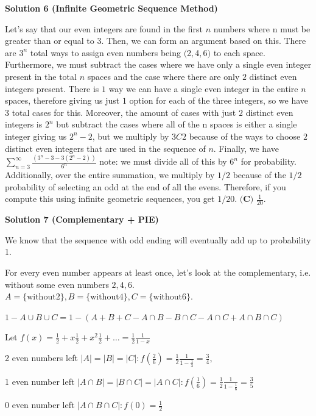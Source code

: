\begin{enumerate}
 



\textbf{Solution 6 (Infinite Geometric Sequence Method)}

Let's say that our even integers are found in the first $n$ numbers where n must be greater than or equal to $3$. Then, we can form an argument based on this. There are $3^n$ total ways to assign even numbers being $($2$,$4$,$6$)$ to each space. Furthermore, we must subtract the cases where we have only a single even integer present in the total $n$ spaces and the case where there are only $2$ distinct even integers present. There is $1$ way we can have a single even integer in the entire $n$ spaces, therefore giving us just $1$ option for each of the three integers, so we have $3$ total cases for this. Moreover, the amount of cases with just $2$ distinct even integers is $2^n$ but subtract the cases where all of the n spaces is either a single integer giving us $2^n-2$, but we multiply by $3C2$ because of the ways to choose $2$ distinct even integers that are used in the sequence of $n$. Finally, we have $\sum_{n=3}^{\infty} \frac{(3^n-3-3(2^n-2))}{6^n}$ note: we must divide all of this by $6^n$ for probability. Additionally, over the entire summation, we multiply by $1/2$ because of the $1/2$ probability of selecting an odd at the end of all the evens. Therefore, if you compute this using infinite geometric sequences, you get $1/20$. $\boxed{\textbf{(C) }\frac{1}{20}.}$




\textbf{Solution 7 (Complementary + PIE)}

We know that the sequence with odd ending will eventually add up to probability 1. 

 For every even number appears at least once, let's look at the complementary, i.e. without some even numbers ${2, 4, 6}$. $A = \{ \text{without} 2\}, B = \{ \text{without} 4\}, C = \{ \text{without} 6\}$.

 $1 - A\cup B\cup C = 1 - (A + B + C - A\cap B - B\cap C - A\cap C + A\cap B\cap C)$

 Let $f(x) = \frac{1}{2} + x\frac{1}{2} + x^2\frac{1}{2} + \ldots = \frac{1}{2} \frac{1}{1-x}$

 2 even numbers left $|A|=|B|=|C|: f(\frac{2}{6}) = \frac{1}{2} \frac{1}{1-\frac{1}{3}} = \frac{3}{4}$,

 1 even number left $|A\cap B| = |B\cap C| = |A\cap C|: f(\frac{1}{6}) = \frac{1}{2} \frac{1}{1-\frac{1}{6}} = \frac{3}{5}$

 0 even number left $|A\cap B\cap C|: f(0) = \frac{1}{2}$


\end{enumerate}
